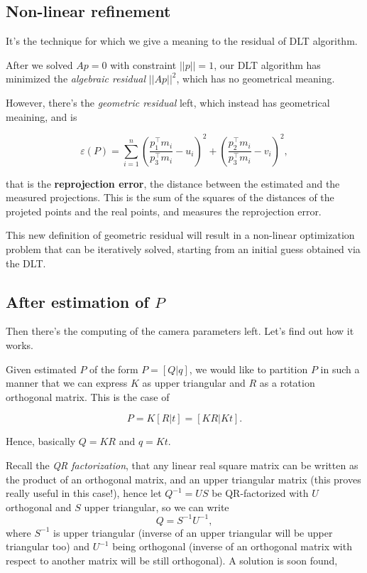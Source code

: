 \documentclass[10pt]{report}
\begin{document}
\subsection{Non-linear refinement}
\label{non-linear-refinement}
It's the technique for which we give a meaning to the residual of DLT
algorithm.

After we solved \(Ap = 0\) with constraint \(||p|| = 1\), our DLT
algorithm has minimized the \emph{algebraic residual} \(||Ap||^2\), which has
no geometrical meaning.

However, there's the \emph{geometric residual} left, which instead has
geometrical meaining, and is

\[\varepsilon (P) = \sum_{i=1}^n \left(\frac{p_1^\top m_i}{p_3^\top m_i} -u_i \right)^2 +\left(\frac{p_2^\top m_i}{p_3^\top m_i} -v_i\right)^2,\]

that is the \textbf{reprojection error}, the distance between the estimated and
the measured projections. This is the sum of the squares of the
distances of the projeted points and the real points, and measures the
reprojection error.

This new definition of geometric residual will result in a non-linear
optimization problem that can be iteratively solved, starting from an
initial guess obtained via the DLT.

\subsection{After estimation of \(P\)}
\label{after-we-have-estimated-p-what-should-we-do}
Then there's the computing of the camera parameters left. Let's find out how
it works.

Given estimated \(P\) of the form \(P = [Q|q]\), we would like to
partition \(P\) in such a manner that we can express \(K\) as upper
triangular and \(R\) as a rotation orthogonal matrix. This is the case
of

\[P = K[R|t] = [KR|Kt].\]

Hence, basically \(Q = KR\) and \(q = Kt\).

Recall the \emph{QR factorization}, that any linear real square matrix can be
written as the product of an orthogonal matrix, and an upper triangular
matrix (this proves really useful in this case!), hence let
\(Q^{-1} = US\) be QR-factorized with \(U\) orthogonal and \(S\) upper triangular, so we can write \[Q = S^{-1}U^{-1},\]
where \(S^{-1}\) is upper triangular (inverse of an upper triangular will
be upper triangular too) and \(U^{-1}\) being orthogonal (inverse of an
orthogonal matrix with respect to another matrix will be still
orthogonal). A solution is soon found,
\end{document}

